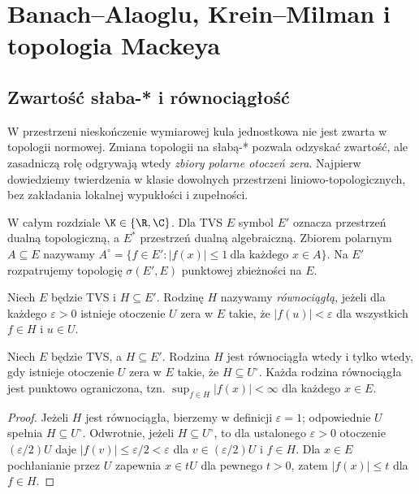 \setcounter{section}{8}
\section{Banach--Alaoglu, Krein--Milman i topologia Mackeya}\label{sec:alaoglu-mackey}

\subsection{Zwartość słaba-* i równociągłość}

W przestrzeni nieskończenie wymiarowej kula jednostkowa nie jest zwarta
w topologii normowej. Zmiana topologii na słabą-* pozwala odzyskać zwartość,
ale zasadniczą rolę odgrywają wtedy \emph{zbiory polarne otoczeń zera}.
Najpierw dowiedziemy twierdzenia w klasie dowolnych przestrzeni
liniowo-topologicznych, bez zakładania lokalnej wypukłości i zupełności.

W całym rozdziale $\K\in\{\R,\C\}$. Dla TVS $E$ symbol $E'$ oznacza
przestrzeń dualną topologiczną, a $E^*$ przestrzeń dualną algebraiczną.
Zbiorem polarnym $A\subseteq E$ nazywamy
$A^\circ=\{f\in E':|f(x)|\le1\ \text{dla każdego }x\in A\}$.
Na $E'$ rozpatrujemy topologię $\sigma(E',E)$ punktowej zbieżności na $E$.

\begin{definicja}\label{def:equicont-family}
Niech $E$ będzie TVS i $H\subseteq E'$. Rodzinę $H$ nazywamy
\emph{równociągłą}, jeżeli dla każdego $\varepsilon>0$ istnieje otoczenie
$U$ zera w $E$ takie, że $|f(u)|<\varepsilon$ dla wszystkich
$f\in H$ i $u\in U$.
\end{definicja}

\begin{stwierdzenie}\label{prop:equicont-polar}
Niech $E$ będzie TVS, a $H\subseteq E'$. Rodzina $H$ jest równociągła
wtedy i tylko wtedy, gdy istnieje otoczenie $U$ zera w $E$ takie,
że $H\subseteq U^\circ$. Każda rodzina równociągła jest punktowo
ograniczona, tzn. $\sup_{f\in H}|f(x)|<\infty$ dla każdego $x\in E$.
\end{stwierdzenie}
\begin{proof}
Jeżeli $H$ jest równociągła, bierzemy w definicji $\varepsilon=1$;
odpowiednie $U$ spełnia $H\subseteq U^\circ$. Odwrotnie,
jeżeli $H\subseteq U^\circ$, to dla ustalonego $\varepsilon>0$
otoczenie $(\varepsilon/2)U$ daje
$|f(v)|\le\varepsilon/2<\varepsilon$ dla $v\in(\varepsilon/2)U$
i $f\in H$. Dla $x\in E$ pochłanianie przez $U$ zapewnia
$x\in tU$ dla pewnego $t>0$, zatem $|f(x)|\le t$ dla $f\in H$.
\end{proof}


